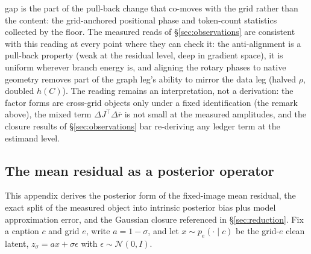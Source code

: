 gap is the part of the pull-back change that co-moves with the grid
rather than the content: the grid-anchored positional phase and
token-count statistics collected by the floor. The measured reads of
\S\ref{sec:observations} are consistent with this reading at every
point where they can check it: the anti-alignment is a pull-back
property (weak at the residual level, deep in gradient space), it is
uniform wherever branch energy is, and aligning the rotary phases to
native geometry removes part of the graph leg's ability to mirror
the data leg (halved $\rho$, doubled $h(C)$). The reading remains an
interpretation, not a derivation: the factor forms are cross-grid
objects only under a fixed identification (the remark above), the
mixed term $\Delta J^{\!\top}\Delta\bar r$ is not small at the
measured amplitudes, and the closure results of
\S\ref{sec:observations} bar re-deriving any ledger term at the
estimand level.

\subsection{The mean residual as a posterior operator}
\label{app:posterior}

This appendix derives the posterior form of the fixed-image mean
residual, the exact split of the measured object into intrinsic
posterior bias plus model approximation error, and the Gaussian
closure referenced in \S\ref{sec:reduction}. Fix a caption $c$ and
grid $e$, write $a = 1 - \sigma$, and let $x \sim p_e(\cdot \mid c)$
be the grid-$e$ clean latent, $z_\sigma = a x + \sigma \epsilon$ with
$\epsilon \sim \mathcal{N}(0, I)$.

